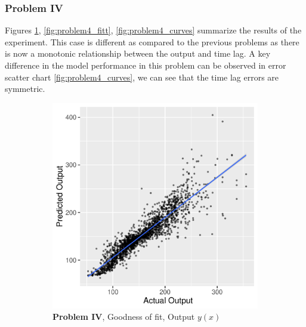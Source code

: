 \documentclass[envcountsect,runningheads]{llncs}
\theoremstyle{etoile}
\begin{document}
\subsubsection{Problem IV}

Figures \ref{fig:problem4_fitv}, \ref{fig:problem4_fitt}, \ref{fig:problem4_curves} summarize 
the results of the experiment. This case is different as compared to the previous problems as there 
is now a monotonic relationship between the output and time lag. A key difference in the model 
performance in this problem can be observed in error scatter chart \ref{fig:problem4_curves}, 
we can see that the time lag errors are symmetric.


\begin{figure}
  \centering

  \begin{subfigure}[b]{0.4\textwidth}
    \centering
    \includegraphics[width=\textwidth]{figures/exp4_scatter_v_test}
    \caption{ \textbf{Problem IV}, Goodness of fit, Output $y(x)$}
    \label{fig:problem4_fitv}
  \end{subfigure}
  \hfill
  \begin{subfigure}[b]{0.4\textwidth}
    \centering

\end{subfigure}
\end{figure}
\end{document}
